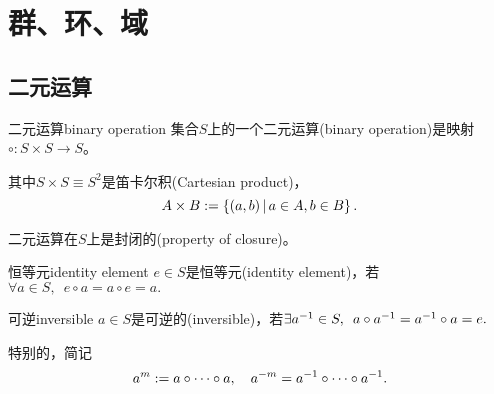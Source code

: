 \section{群、环、域}
\subsection{二元运算}
\begin{definition}{二元运算}{binary operation}
	集合$S$上的一个二元运算(binary operation)是映射$\circ:S\times S\to S$。

	其中$S\times S\equiv S^2$是笛卡尔积(Cartesian product)，
	\[
		A\times B:=\left\{(a,b)\,\middle\vert\,a\in A, b\in B\right\}.
	\]
\end{definition}
二元运算在$S$上是封闭的(property of closure)。
\begin{definition}{恒等元}{identity element}
	$e\in S$是恒等元(identity element)，若$\forall a\in S,\enspace e\circ a=a\circ e=a.$
\end{definition}
\begin{definition}{可逆}{inversible}
	$a\in S$是可逆的(inversible)，若$\exists a^{-1}\in S,\enspace a\circ a^{-1}=a^{-1}\circ a=e.$
\end{definition}
特别的，简记
\[
	a^m:=a\circ\cdots\circ a,\quad a^{-m}=a^{-1}\circ\cdots\circ a^{-1}.
\]
